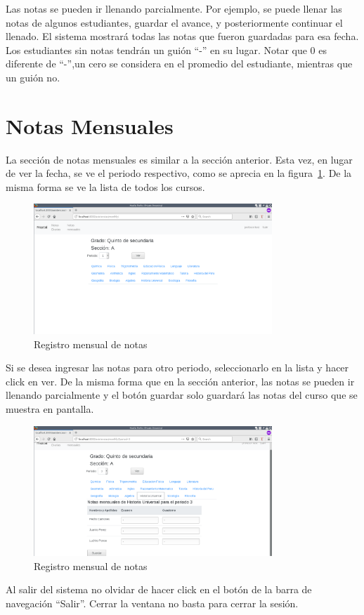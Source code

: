 \documentclass[12pt]{article}
\begin{document}
Las notas se pueden ir llenando parcialmente. Por ejemplo, se puede llenar las notas de algunos
estudiantes, guardar el avance, y posteriormente continuar el llenado. El sistema mostrar\'a
todas las notas que fueron guardadas para esa fecha. Los estudiantes sin notas tendr\'an un gui\'on
``-'' en su lugar. Notar que 0 es diferente de ``-'',un cero se considera en el promedio del estudiante,
mientras que un gui\'on no.

\newpage
\section{Notas Mensuales}
La secci\'on de notas mensuales es similar a la secci\'on anterior. Esta vez, en lugar de ver la fecha,
se ve el periodo respectivo, como se aprecia en la figura~\ref{fig:profesor4}. De la misma forma se ve
la lista de todos los cursos.
\begin{figure}[ht]
  \centering
  \includegraphics[width=0.8\textwidth]{images/profesor4.png}
  \caption{Registro mensual de notas}
  \label{fig:profesor4}
\end{figure}

Si se desea ingresar las notas para otro periodo, seleccionarlo en la lista y hacer click en ver.
De la misma forma que en la secci\'on anterior, las notas se pueden ir llenando parcialmente y el
bot\'on guardar solo guardar\'a las notas del curso que se muestra en pantalla.
\begin{figure}[th]
  \centering
  \includegraphics[width=0.8\textwidth]{images/profesor5.png}
  \caption{Registro mensual de notas}
  \label{fig:profesor5}
\end{figure}

Al salir del sistema no olvidar de hacer click en el bot\'on de la barra de navegaci\'on ``Salir''.
Cerrar la ventana no basta para cerrar la sesi\'on.
\end{document}
